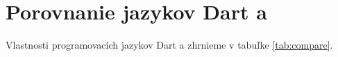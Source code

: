 





\section{Porovnanie jazykov Dart a \JS{}}
\NEW{}
Vlastnosti programovacích jazykov Dart a \JS{} zhrnieme v tabuľke \ref{tab:compare}. 

